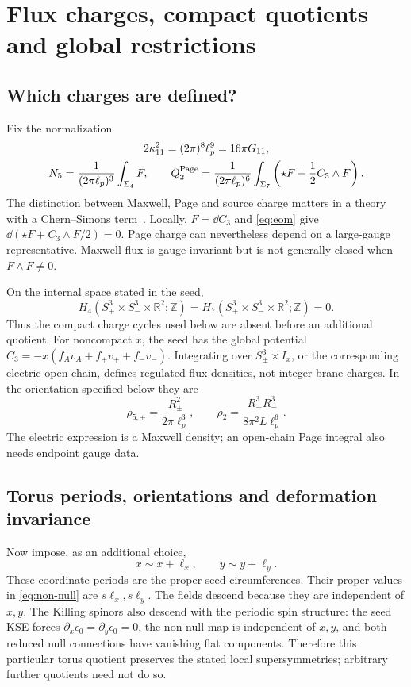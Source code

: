 \section{Flux charges, compact quotients and global restrictions}\label{sec:charges}
\subsection{Which charges are defined?}
Fix the normalization
\begin{equation}
\begin{gathered}
2\kappa_{11}^2=(2\pi)^8\ell_p^9=16\pi G_{11},\\
N_5=\frac{1}{(2\pi\ell_p)^3}\int_{\Sigma_4}F,\qquad
Q_2^{\rm Page}=\frac{1}{(2\pi\ell_p)^6}\int_{\Sigma_7}
\left(\star F+\frac12C_3\wedge F\right).
\end{gathered}
\label{charge:definitions}
\end{equation}
The distinction between Maxwell, Page and source charge matters in a theory with a Chern--Simons term~\cite{Marolf2000}. Locally, $F=\dd C_3$ and \eqref{eq:eom} give $\dd(\star F+C_3\wedge F/2)=0$. Page charge can nevertheless depend on a large-gauge representative. Maxwell flux is gauge invariant but is not generally closed when $F\wedge F\ne0$.

On the internal space stated in the seed,
\begin{equation}
H_4(S^3_+\times S^3_-\times\mathbb R^2;\mathbb Z)
=H_7(S^3_+\times S^3_-\times\mathbb R^2;\mathbb Z)=0.
\end{equation}
Thus the compact charge cycles used below are absent before an additional quotient. For noncompact $x$, the seed has the global potential $C_3=-x(f_Av_A+f_+v_++f_-v_-)$. Integrating over $S^3_\pm\times I_x$, or the corresponding electric open chain, defines regulated flux densities, not integer brane charges. In the orientation specified below they are
\begin{equation}
\rho_{5,\pm}=\frac{R_\pm^2}{2\pi\ell_p^3},\qquad
\rho_2=\frac{R_+^3R_-^3}{8\pi^2L\ell_p^6}.
\end{equation}
The electric expression is a Maxwell density; an open-chain Page integral also needs endpoint gauge data.

\subsection{Torus periods, orientations and deformation invariance}
Now impose, as an additional choice,
\begin{equation}
x\sim x+\ell_x,\qquad y\sim y+\ell_y.
\label{charge:quotient}
\end{equation}
These coordinate periods are the proper seed circumferences. Their proper values in \eqref{eq:non-null} are $s\ell_x,s\ell_y$. The fields descend because they are independent of $x,y$. The Killing spinors also descend with the periodic spin structure: the seed KSE forces $\partial_x\epsilon_0=\partial_y\epsilon_0=0$, the non-null map is independent of $x,y$, and both reduced null connections have vanishing flat components. Therefore this particular torus quotient preserves the stated local supersymmetries; arbitrary further quotients need not do so.

